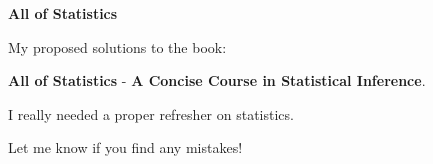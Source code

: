 \noindent
{\Huge \textbf{All of Statistics}}

\bigskip\noindent
My proposed solutions to the book:

\medskip\noindent
{\Large\textbf{All of Statistics}} - \textbf{A Concise Course in Statistical Inference}.%

I really needed a proper refresher on statistics.

\bigskip\noindent
Let me know if you find any mistakes!

\tableofcontents